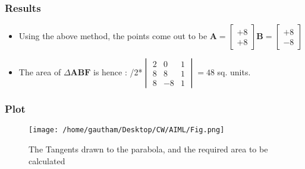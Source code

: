 \documentclass{beamer}
\begin{document}
\begin{frame}
\frametitle{Results}
\begin{itemize}
	\item<1->Using the above method, the points come out to be \newline \newline$\mathbf{A} = \begin{bmatrix} +8 \\ +8
	\end{bmatrix} $\newline $\mathbf{B} = \begin{bmatrix} +8 \\ -8
	\end{bmatrix}$\newline \newline
	\item<2->The area of $\Delta\mathbf{ABF}$ is hence : \newline {}/2*$\begin{vmatrix}2 & 0 & 1 \\ 8 & 8 & 1 \\ 8 & -8 & 1
	\end{vmatrix} = 48$ sq. units.
\end{itemize}
\end{frame}

\begin{frame}
	\frametitle{Plot}
	\begin{figure}[h]
	\centering
	\texttt{[image: /home/gautham/Desktop/CW/AIML/Fig.png]}
	\caption{The Tangents drawn to the parabola, and the required area to be calculated}
	\label{foobar-figure}
	\end{figure}

\end{frame}
\end{document}
